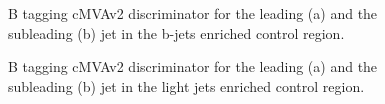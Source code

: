 \begin{figure}[!h]
\centering
{}
\caption{B tagging cMVAv2 discriminator for the leading (a) and the subleading (b)
jet in the b-jets enriched control region.\label{fig:bpogSF}}
\end{figure}
\begin{figure}[!h]
\centering
{}
\caption{B tagging cMVAv2 discriminator for the leading (a) and the subleading (b)
jet in the light jets enriched control region.\label{fig:bpogSF_Z}}
\end{figure}

